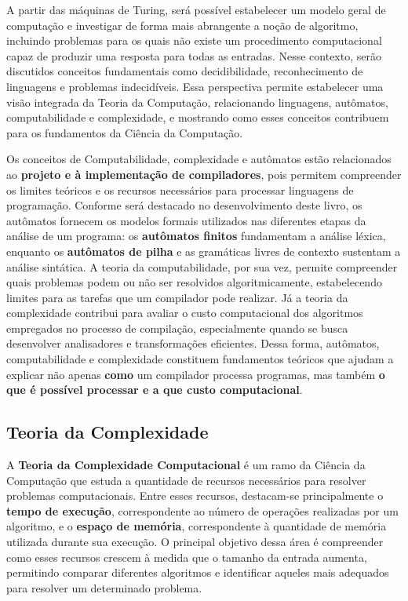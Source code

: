 \documentclass[
  brazilian,
  letterpaper,
]{book}
\theoremstyle{plain}
\theoremstyle{definition}
\theoremstyle{remark}
\begin{document}
A partir das máquinas de Turing, será possível estabelecer um modelo
geral de computação e investigar de forma mais abrangente a noção de
algoritmo, incluindo problemas para os quais não existe um procedimento
computacional capaz de produzir uma resposta para todas as entradas.
Nesse contexto, serão discutidos conceitos fundamentais como
decidibilidade, reconhecimento de linguagens e problemas indecidíveis.
Essa perspectiva permite estabelecer uma visão integrada da Teoria da
Computação, relacionando linguagens, autômatos, computabilidade e
complexidade, e mostrando como esses conceitos contribuem para os
fundamentos da Ciência da Computação.

Os conceitos de Computabilidade, complexidade e autômatos estão
relacionados ao \textbf{projeto e à implementação de compiladores}, pois
permitem compreender os limites teóricos e os recursos necessários para
processar linguagens de programação. Conforme será destacado no
desenvolvimento deste livro, os autômatos fornecem os modelos formais
utilizados nas diferentes etapas da análise de um programa: os
\textbf{autômatos finitos} fundamentam a análise léxica, enquanto os
\textbf{autômatos de pilha} e as gramáticas livres de contexto sustentam
a análise sintática. A teoria da computabilidade, por sua vez, permite
compreender quais problemas podem ou não ser resolvidos
algoritmicamente, estabelecendo limites para as tarefas que um
compilador pode realizar. Já a teoria da complexidade contribui para
avaliar o custo computacional dos algoritmos empregados no processo de
compilação, especialmente quando se busca desenvolver analisadores e
transformações eficientes. Dessa forma, autômatos, computabilidade e
complexidade constituem fundamentos teóricos que ajudam a explicar não
apenas \textbf{como} um compilador processa programas, mas também
\textbf{o que é possível processar e a que custo computacional}.

\subsection{Teoria da Complexidade}\label{teoria-da-complexidade}

A \textbf{Teoria da Complexidade Computacional} é um ramo da Ciência da
Computação que estuda a quantidade de recursos necessários para resolver
problemas computacionais. Entre esses recursos, destacam-se
principalmente o \textbf{tempo de execução}, correspondente ao número de
operações realizadas por um algoritmo, e o \textbf{espaço de memória},
correspondente à quantidade de memória utilizada durante sua execução. O
principal objetivo dessa área é compreender como esses recursos crescem
à medida que o tamanho da entrada aumenta, permitindo comparar
diferentes algoritmos e identificar aqueles mais adequados para resolver
um determinado problema.
\end{document}
